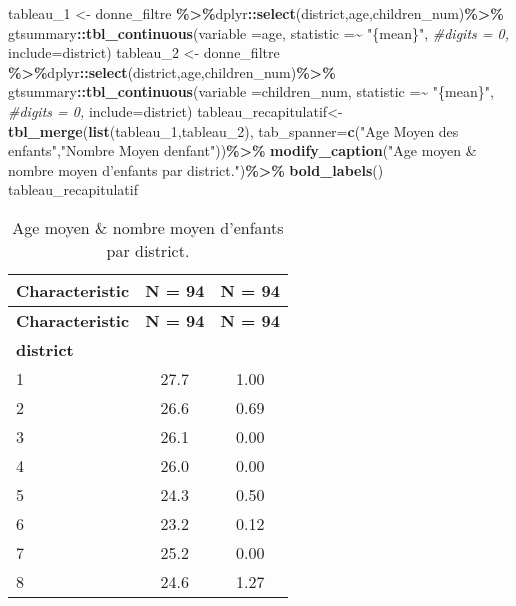 \documentclass[
]{article}
\newenvironment{Shaded}{\begin{snugshade}}{\end{snugshade}}
\newcommand{\AttributeTok}[1]{\textcolor[rgb]{0.13,0.29,0.53}{#1}}
\newcommand{\CommentTok}[1]{\textcolor[rgb]{0.56,0.35,0.01}{\textit{#1}}}
\newcommand{\FunctionTok}[1]{\textcolor[rgb]{0.13,0.29,0.53}{\textbf{#1}}}
\newcommand{\NormalTok}[1]{#1}
\newcommand{\OtherTok}[1]{\textcolor[rgb]{0.56,0.35,0.01}{#1}}
\newcommand{\SpecialCharTok}[1]{\textcolor[rgb]{0.81,0.36,0.00}{\textbf{#1}}}
\newcommand{\StringTok}[1]{\textcolor[rgb]{0.31,0.60,0.02}{#1}}
\begin{document}
\begin{Shaded}
\begin{Highlighting}[]
\NormalTok{tableau\_1 }\OtherTok{\textless{}{-}}\NormalTok{ donne\_filtre }\SpecialCharTok{\%\textgreater{}\%}\NormalTok{dplyr}\SpecialCharTok{::}\FunctionTok{select}\NormalTok{(district,age,children\_num)}\SpecialCharTok{\%\textgreater{}\%}
\NormalTok{  gtsummary}\SpecialCharTok{::}\FunctionTok{tbl\_continuous}\NormalTok{(}\AttributeTok{variable =}\NormalTok{age,}
                            \AttributeTok{statistic =}\SpecialCharTok{\textasciitilde{}} \StringTok{"\{mean\}"}\NormalTok{,}
                            \CommentTok{\#digits = 0,}
                            \AttributeTok{include=}\NormalTok{district)}
\NormalTok{tableau\_2 }\OtherTok{\textless{}{-}}\NormalTok{ donne\_filtre }\SpecialCharTok{\%\textgreater{}\%}\NormalTok{dplyr}\SpecialCharTok{::}\FunctionTok{select}\NormalTok{(district,age,children\_num)}\SpecialCharTok{\%\textgreater{}\%}
\NormalTok{  gtsummary}\SpecialCharTok{::}\FunctionTok{tbl\_continuous}\NormalTok{(}\AttributeTok{variable =}\NormalTok{children\_num,}
                            \AttributeTok{statistic =}\SpecialCharTok{\textasciitilde{}} \StringTok{"\{mean\}"}\NormalTok{,}
                            \CommentTok{\#digits = 0,}
                            \AttributeTok{include=}\NormalTok{district)}
\NormalTok{tableau\_recapitulatif}\OtherTok{\textless{}{-}}\FunctionTok{tbl\_merge}\NormalTok{(}\FunctionTok{list}\NormalTok{(tableau\_1,tableau\_2),}
                                 \AttributeTok{tab\_spanner=}\FunctionTok{c}\NormalTok{(}\StringTok{"Age Moyen des enfants"}\NormalTok{,}\StringTok{"Nombre Moyen d\textquotesingle{}enfant"}\NormalTok{))}\SpecialCharTok{\%\textgreater{}\%}
  \FunctionTok{modify\_caption}\NormalTok{(}\StringTok{"Age moyen \& nombre moyen d’enfants par district."}\NormalTok{)}\SpecialCharTok{\%\textgreater{}\%} \FunctionTok{bold\_labels}\NormalTok{()}
\NormalTok{tableau\_recapitulatif}
\end{Highlighting}
\end{Shaded}

\begin{longtable}[]{@{}lcc@{}}
\caption{Age moyen \& nombre moyen d'enfants par
district.}\tabularnewline
\toprule\noalign{}
\textbf{Characteristic} & \textbf{N = 94} & \textbf{N = 94} \\
\midrule\noalign{}
\endfirsthead
\toprule\noalign{}
\textbf{Characteristic} & \textbf{N = 94} & \textbf{N = 94} \\
\midrule\noalign{}
\endhead
\bottomrule\noalign{}
\endlastfoot
\textbf{district} & & \\
1 & 27.7 & 1.00 \\
2 & 26.6 & 0.69 \\
3 & 26.1 & 0.00 \\
4 & 26.0 & 0.00 \\
5 & 24.3 & 0.50 \\
6 & 23.2 & 0.12 \\
7 & 25.2 & 0.00 \\
8 & 24.6 & 1.27 \\
\end{longtable}
\end{document}
